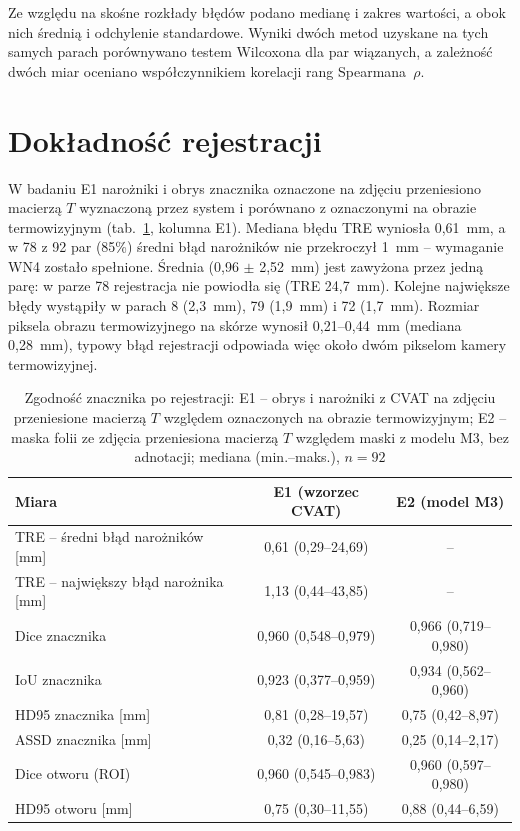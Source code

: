 Ze względu na skośne rozkłady błędów podano medianę i zakres wartości, a obok nich średnią i odchylenie standardowe. Wyniki dwóch metod uzyskane na tych samych parach porównywano testem Wilcoxona dla par wiązanych, a zależność dwóch miar oceniano współczynnikiem korelacji rang Spearmana~$\rho$.

\section{Dokładność rejestracji}
\label{sec:wyniki-rejestracja}

W badaniu E1 narożniki i obrys znacznika oznaczone na zdjęciu przeniesiono macierzą $T$ wyznaczoną przez system i porównano z oznaczonymi na obrazie termowizyjnym (tab.~\ref{tab:e1-e2}, kolumna E1). Mediana błędu TRE wyniosła 0,61~mm, a w 78 z 92 par (85\%) średni błąd narożników nie przekroczył 1~mm -- wymaganie WN4 zostało spełnione. Średnia (0,96 $\pm$ 2,52~mm) jest zawyżona przez jedną parę: w parze 78 rejestracja nie powiodła się (TRE 24,7~mm). Kolejne największe błędy wystąpiły w parach 8 (2,3~mm), 79 (1,9~mm) i 72 (1,7~mm). Rozmiar piksela obrazu termowizyjnego na skórze wynosił 0,21--0,44~mm (mediana 0,28~mm), typowy błąd rejestracji odpowiada więc około dwóm pikselom kamery termowizyjnej.

\begin{table}[htbp]
  \centering
  \caption{Zgodność znacznika po rejestracji: E1 -- obrys i narożniki z CVAT na zdjęciu przeniesione macierzą $T$ względem oznaczonych na obrazie termowizyjnym; E2 -- maska folii ze zdjęcia przeniesiona macierzą $T$ względem maski z modelu M3, bez adnotacji; mediana (min.--maks.), $n = 92$}
  \label{tab:e1-e2}
  \small
  \begin{tabular}{lcc}
    \toprule
    Miara & E1 (wzorzec CVAT) & E2 (model M3) \\
    \midrule
    TRE -- średni błąd narożników [mm] & 0,61 (0,29--24,69) & -- \\
    TRE -- największy błąd narożnika [mm] & 1,13 (0,44--43,85) & -- \\
    Dice znacznika & 0,960 (0,548--0,979) & 0,966 (0,719--0,980) \\
    IoU znacznika & 0,923 (0,377--0,959) & 0,934 (0,562--0,960) \\
    HD95 znacznika [mm] & 0,81 (0,28--19,57) & 0,75 (0,42--8,97) \\
    ASSD znacznika [mm] & 0,32 (0,16--5,63) & 0,25 (0,14--2,17) \\
    Dice otworu (ROI) & 0,960 (0,545--0,983) & 0,960 (0,597--0,980) \\
    HD95 otworu [mm] & 0,75 (0,30--11,55) & 0,88 (0,44--6,59) \\
    \bottomrule
  \end{tabular}
\end{table}

